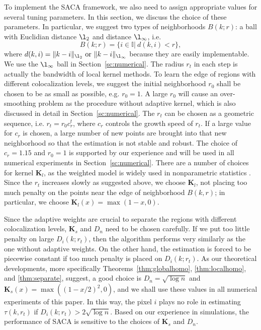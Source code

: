 \documentclass[10pt,twocolumn,twoside]{IEEEtran}
\def\II{{\mathbb I}}
\def\bK{\mathbf K}
\begin{document}
To implement the SACA framework, we also need to assign appropriate values for several tuning parameters. In this section, we discuss the choice of these parameters. In particular, we suggest two types of neighborhoods $B(k;r)$: a ball with Euclidian distance $\l_2$ and distance $\l_\infty$, i.e.  
$$
B(k;r)=\{i\in \II|\ d(k,i)<r\},
$$
where $d(k,i)=\|k-i\|_{\l_2}\ {\rm or}\ \|k-i\|_{\l_\infty}$ because they are easily implementable. We use the $\l_\infty$ ball in Section~\ref{sc:numerical}. The radius $r_t$ in each step is actually the bandwidth of local kernel methods. To learn the edge of regions with different colocalization levels, we suggest the initial neighborhood $r_0$ shall be chosen to be as small as possible, e.g. $r_0=1$. A large $r_0$ will cause an over-smoothing problem as the procedure without adaptive kernel, which is also discussed in detail in Section~\ref{sc:numerical}. The $r_t$ can be chosen as a geometric sequence, i.e. $r_t=r_0c_r^t$, where $c_r$ controls the growth speed of $r_t$. If a large value for $c_r$ is chosen, a large number of new points are brought into that new neighborhood so that the estimation is not stable and robust. The choice of $c_r=1.15$ and $r_0=1$ is supported by our experience and will be used in all numerical experiments in Section~\ref{sc:numerical}. There are a number of choices for kernel $\bK_l$, as the weighted model is widely used in nonparametric statistics \citep[see][]{gyorfi2006}. Since the $r_t$ increases slowly as suggested above, we choose $\bK_l$, not placing too much penalty on the points near the edge of neighborhood $B(k,r)$; in particular, we choose $\bK_l(x)=\max(1-x,0)$.

Since the adaptive weights are crucial to separate the regions with different colocalization levels, $\bK_s$ and $D_n$ need to be chosen carefully. If we put too little penalty on large $D_i(k;r_t)$, then the algorithm performs very similarly as the one without adaptive weights. On the other hand, the estimation is forced to be piecewise constant if too much penalty is placed on $D_i(k;r_t)$. As our theoretical developments, more specifically Theorems~\ref{thm:globalhomo}, \ref{thm:localhomo}, and \ref{thm:separate}, suggest, a good choice is $D_n=\sqrt{\log n}$ and $\bK_s(x)=\max((1-x/2)^2,0)$, and we shall use these values in all numerical experiments of this paper. In this way, the pixel $i$ plays no role in estimating $\tau(k,r_t)$ if $D_i(k;r_t)>2\sqrt{\log n}$. Based on our experience in simulations, the performance of SACA is sensitive to the choices of $\bK_s$ and $D_n$.
\end{document}
